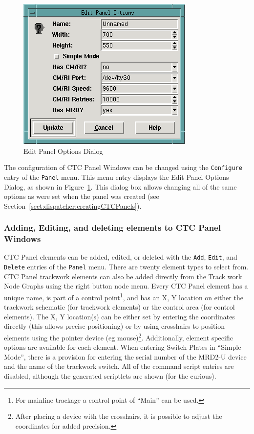 \begin{figure}[hbpt]
\begin{centering}
\includegraphics{DISPEditPanelOptions.png}
\caption{Edit Panel Options Dialog}
\label{fig:dispatcher:editPanelOptsDialog}
\end{centering}
\end{figure}
The configuration of CTC Panel Windows can be changed using the
\verb=Configure= entry of the \verb=Panel= menu.  This menu entry
displays the Edit Panel Options Dialog, as shown in
Figure~\ref{fig:dispatcher:editPanelOptsDialog}. This dialog box allows
changing all of the same options as were set when the panel was created
(see Section~\ref{sect:dispatcher:creatingCTCPanels}).

\subsubsection{Adding, Editing, and deleting elements to CTC Panel Windows}

CTC Panel elements can be added, edited, or deleted with the
\verb=Add=, \verb=Edit=, and \verb=Delete= entries of the \verb=Panel=
menu. There are twenty element types to select from.  CTC Panel
trackwork elements can also be added directly from the Track work Node
Graphs using the right button node menu.  Every CTC Panel element has a
unique name, is part of a control point\footnote{For mainline trackage
a control point of ``Main'' can be used.}, and has an X, Y location on
either the trackwork schematic (for trackwork elements) or the control
area (for control elements). The X, Y location(s) can be either set by
entering the coordinates directly (this allows precise positioning) or
by using crosshairs to position elements using the pointer device (eg
mouse)\footnote{After placing a device with the crosshairs, it is
possible to adjust the coordinates for added precision.}. Additionally,
element specific options are available for each element. When entering
Switch Plates in ``Simple Mode'', there is a provision for entering the
serial number of the MRD2-U device and the name of the trackwork
switch.  All of the command script entries are disabled, although the
generated scriptlets are shown (for the curious).

